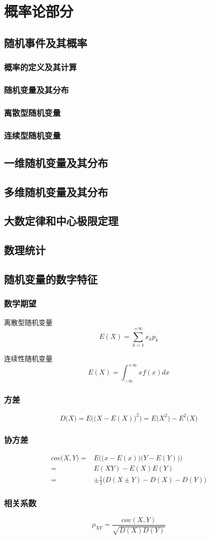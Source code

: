 \documentclass[a4paper,zihao=-4,UTF8]{ctexbook}
\begin{document}
\chapter{概率论部分}
\section{随机事件及其概率}
\subsection{概率的定义及其计算}
\subsection{随机变量及其分布}
\subsection{离散型随机变量}
\subsection{连续型随机变量}
\section{一维随机变量及其分布}
\section{多维随机变量及其分布}
\section{大数定律和中心极限定理}
\section{数理统计}
\section{随机变量的数字特征}
\subsection{数学期望}
离散型随机变量
\[E(X)=\sum_{k=1}^{+\infty}x_kp_k\]

连续性随机变量
\[E(X)=\int_{-\infty}^{+\infty}xf(x)dx\]
\subsection{方差}
\[D\big(X\big)=E\Big(\big(X-E(X)\big)^2\Big)=E\big(X^2\big)-E^2\big(X\big)\]
\subsection{协方差}
\begin{align*}
    cov\big(X,Y\big)={}& E\Big(\big(x-E(x)\big)\big(Y-E(Y)\big)\Big)\\
                    ={}& E(XY)-E(X)E(Y)\\
                    ={}& \pm\frac 12\big(D(X\pm Y)-D(X)-D(Y)\big)
\end{align*}

\subsection{相关系数}
\[\rho_{XY}=\frac{cov(X,Y)}{\sqrt{D(X)D(Y)}}\]
\end{document}
